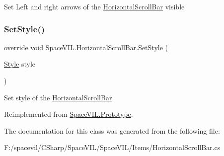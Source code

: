 Set Left and right arrows of the \mbox{\hyperlink{class_space_v_i_l_1_1_horizontal_scroll_bar}{Horizontal\+Scroll\+Bar}} visible 

\mbox{\label{class_space_v_i_l_1_1_horizontal_scroll_bar_ab871a5c2d291dadd8c902efd361079d5}} 
\subsubsection{\texorpdfstring{Set\+Style()}{SetStyle()}}
{\footnotesize\ttfamily override void Space\+V\+I\+L.\+Horizontal\+Scroll\+Bar.\+Set\+Style (\begin{DoxyParamCaption}\item[{\mbox{\hyperlink{class_space_v_i_l_1_1_decorations_1_1_style}{Style}}}]{style }\end{DoxyParamCaption})\hspace{0.3cm}{\ttfamily [virtual]}}



Set style of the \mbox{\hyperlink{class_space_v_i_l_1_1_horizontal_scroll_bar}{Horizontal\+Scroll\+Bar}} 



Reimplemented from \mbox{\hyperlink{class_space_v_i_l_1_1_prototype_ae96644a6ace490afb376fb542161e541}{Space\+V\+I\+L.\+Prototype}}.



The documentation for this class was generated from the following file\+:\begin{DoxyCompactItemize}
\item 
F\+:/spacevil/\+C\+Sharp/\+Space\+V\+I\+L/\+Space\+V\+I\+L/\+Items/Horizontal\+Scroll\+Bar.\+cs\end{DoxyCompactItemize}
